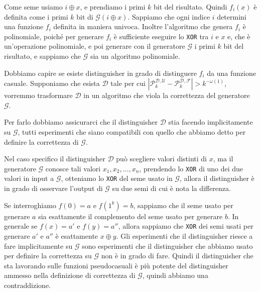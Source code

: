 \begin{figure}[H]
  \centering
\end{figure}
Come seme usiamo $i \oplus x$, e prendiamo i primi $k$ bit del risultato. Quindi 
$f_i(x)$ è definita come i primi $k$ bit di $\mathcal{G}(i \oplus x)$.
Sappiamo che ogni 
indice $i$ determini una funzione $f_i$ definita in maniera univoca.
Inoltre l'algoritmo che genera $f_i$ è polinomiale, poiché per generare $f_i$
è sufficiente eseguire lo \texttt{XOR} tra $i$ e $x$ e, che è un'operazione polinomiale,
e poi generare con il generatore $\mathcal{G}$ i primi $k$ bit del risultato, e sappiamo che 
$\mathcal{G}$ sia un algoritmo polinomiale.

Dobbiamo capire se esiste distinguisher in grado di distinguere $f_i$ da una funzione
casuale. Supponiamo che esista $\mathcal{D}$ tale per cui 
$\left| \mathcal{P}_k^{\mathcal{D}, \mathcal{U}} - \mathcal{P}_k^{\mathcal{D}, \mathcal{F}}
\right| > k^{-\omega(1)}$, vorremmo trasformare $\mathcal{D}$ in un algoritmo
che viola la correttezza del generatore $\mathcal{G}$.

Per farlo dobbiamo assicurarci che il distinguisher $\mathcal{D}$ stia facendo 
implicitamente su $\mathcal{G}$, tutti esperimenti che siano compatibili con quello 
che abbiamo detto per definire la correttezza di $\mathcal{G}$.

Nel caso specifico il distinguisher $\mathcal{D}$ può scegliere 
valori distinti di $x$, ma il generatore $\mathcal{G}$ conosce tali 
valori $x_1, x_2, \dots, x_n$, prendendo lo \texttt{XOR} di uno dei 
due valori in input a $\mathcal{G}$, otteniamo lo \texttt{XOR} 
del seme usato in $\mathcal{G}$, allora il distinguisher è in grado 
di osservare l'output di $\mathcal{G}$ su due semi di cui è nota 
la differenza.

Se interroghiamo $f(0) = a$ e $f(1^k)= b$, sappiamo che il seme
usato per generare $a$ sia esattamente il complemento del seme usato 
per generare $b$. In generale se $f(x) = a'$ e $f(y)=a''$, allora
sappiamo che \texttt{XOR} dei semi usati per generare $a'$ e $a''$
è esattamente $x \oplus y$. Gli esperimenti che il distinguisher
riesce a fare implicitamente su $\mathcal{G}$ sono esperimenti 
che il distinguisher che abbiamo usato per definire la correttezza
su $\mathcal{G}$ non è in grado di fare.
Quindi il distinguisher che sta lavorando sulle funzioni pseudocasuali 
è più potente del distinguisher ammesso nella definizione di
correttezza di $\mathcal{G}$, quindi abbiamo una contraddizione.


